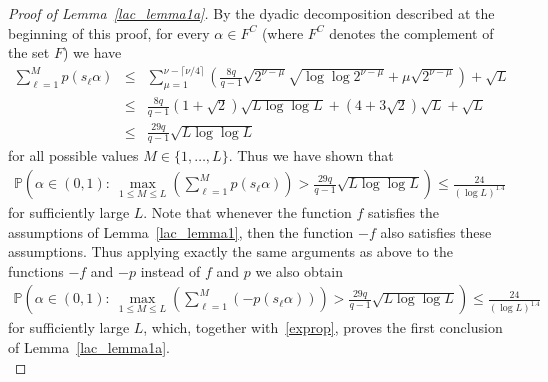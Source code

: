 \documentclass[12pt]{amsart}
\newcommand {\p} {\mathbb{P}}
\begin{document}
\begin{proof}[Proof of Lemma~\ref{lac_lemma1a}]
By the dyadic decomposition described at the beginning of this proof, for every $\alpha \in F^C$ (where $F^C$ denotes the complement of the set $F$) we have
\begin{eqnarray*}
\sum_{\ell=1}^M p(s_\ell \alpha) & \leq & \sum_{\mu=1}^{\nu - \lceil\nu/4\rceil} \left( \frac{8q}{q-1} \sqrt{2^{\nu-\mu}} \sqrt{\log \log 2^{\nu-\mu}} + \mu \sqrt{2^{\nu-\mu}} \right) + \sqrt{L} \\
& \leq & \frac{8q}{q-1} (1 + \sqrt{2}) \sqrt{L \log \log L} + (4 + 3 \sqrt{2})  \sqrt{L} + \sqrt{L} \\
& \leq & \frac{29q}{q-1} \sqrt{L \log \log L}
\end{eqnarray*}
for all possible values $M \in \{1, \dots, L\}$. Thus we have shown that 
\begin{eqnarray} 
\p \left( \alpha \in (0,1):~\max_{1 \leq M \leq L} \left(\sum_{\ell=1}^M p(s_\ell \alpha)\right) > \frac{29 q}{q-1} \sqrt{L \log \log L} \right) \leq \frac{24}{(\log L)^{1.4}} \label{exprop}
\end{eqnarray}
for sufficiently large $L$. Note that whenever the function $f$ satisfies the assumptions of Lemma~\ref{lac_lemma1}, then the function $-f$ also satisfies these assumptions. Thus applying exactly the same arguments as above to the functions $-f$ and $-p$ instead of $f$ and $p$ we also obtain
\begin{eqnarray*}
\p \left( \alpha \in (0,1):~\max_{1 \leq M \leq L} \left(\sum_{\ell=1}^M \left(- p(s_\ell \alpha)\right)\right) > \frac{29 q}{q-1} \sqrt{L \log \log L} \right) \leq \frac{24}{(\log L)^{1.4}}
\end{eqnarray*}
for sufficiently large $L$, which, together with~\eqref{exprop}, proves the first conclusion of Lemma~\ref{lac_lemma1a}.\\


\end{proof}
\end{document}
